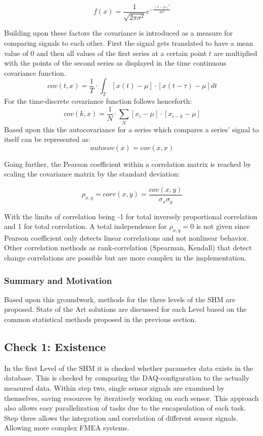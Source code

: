 \begin{equation}
    f(x)=\frac{1}{\sqrt{2 \pi \sigma^2}} e^{-\frac{(x-\mu)^2}{2 \sigma^2}}
    \label{eq:pmf}
\end{equation}

Building upon these factors the covariance is introduced as a measure for comparing signals to each other. First the signal gets translated to have a mean value of 0 and then all values of the first series at a certain point $t$ are multiplied with the points of the second series as displayed in the time continuous covariance function.
$$
cov(t, x)=\frac{1}{T} \cdot \int_T[x(t)-\mu] \cdot[x(t-\tau)-\mu] d t
$$
For the time-discrete covariance function follows henceforth:
$$
cov(k, x)=\frac{1}{N} \cdot \sum_N\left[x_i-\mu\right] \cdot\left[x_{i-k}-\mu\right]
$$
Based upon this the autocovariance for a series which compares a series' signal to itself can be represented as:
$$autocov(x) = cov(x,x)$$

Going further, the Pearson coefficient within a correlation matrix is reached by scaling the covariance matrix by the standard deviation: \cite{smith_scientist_1999}

$$\rho_{x,y} = corr(x,y)=\frac{cov(x,y)}{\sigma_x \sigma_y}$$

With the limits of correlation being -1 for total inversely proportional correlation and 1 for total correlation. A total independence for $\rho_{x,y}=0$ is not given since Pearson coefficient only detects linear correlations and not nonlinear behavior. Other correlation methods as rank-correlation (Spearman, Kendall) that detect change correlations are possible but are more complex in the implementation.

\subsubsection{Summary and Motivation}

Based upon this groundwork, methods for the three levels of the SHM are proposed. State of the Art solutions are discussed for each Level based on the common statistical methods proposed in the previous section.

\subsection{Check 1: Existence}
In the first Level of the SHM it is checked whether parameter data exists in the database. This is checked by comparing the DAQ-configuration to the actually measured data. Within step two, single sensor signals are examined by themselves, saving resources by iteratively working on each sensor. This approach also allows easy parallelization of tasks due to the encapsulation of each task. Step three allows the integration and correlation of different sensor signals. Allowing more complex FMEA systems.

